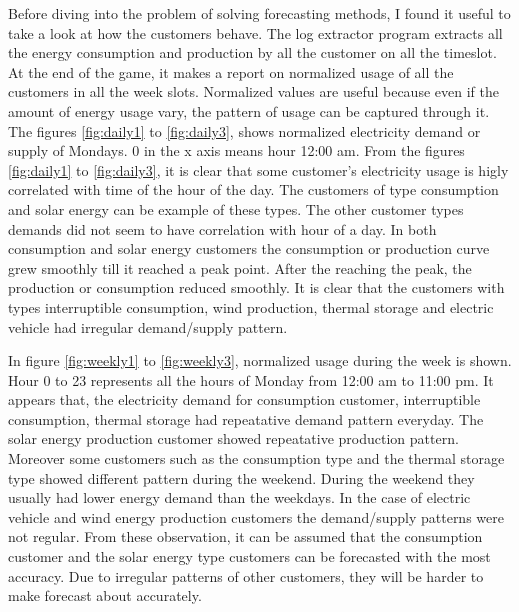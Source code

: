 Before diving into the problem of solving forecasting methods, I found it useful to take a look at how the customers behave. The log extractor program extracts all the energy consumption and production by all the customer on all the timeslot. At the end of the game, it makes a report on normalized usage of all the customers in all the week slots. Normalized values are useful because even if the amount of energy usage vary, the pattern of usage can be captured through it. The figures \ref{fig:daily1} to \ref{fig:daily3}, shows normalized electricity demand or supply of Mondays. 0 in the x axis means hour 12:00 am. From the figures \ref{fig:daily1} to \ref{fig:daily3}, it is clear that some customer's electricity usage is higly correlated with time of the hour of the day. The customers of type consumption and solar energy can be example of these types. The other customer types demands did not seem to have correlation with hour of a day. In both consumption and solar energy customers the consumption or production curve grew smoothly till it reached a peak point. After the reaching the peak, the production or consumption reduced smoothly. It is clear that the customers with types interruptible consumption, wind production, thermal storage and electric vehicle had irregular demand/supply pattern. 

In figure \ref{fig:weekly1} to \ref{fig:weekly3}, normalized usage during the week is shown. Hour 0 to 23 represents all the hours of Monday from 12:00 am to 11:00 pm. It appears that, the electricity demand for consumption customer, interruptible consumption, thermal storage had repeatative demand pattern everyday. The  solar energy production customer showed repeatative production pattern. Moreover some customers such as the consumption type and the thermal storage type showed different pattern during the weekend. During the weekend they usually had lower energy demand than the weekdays. In the case of electric vehicle and wind energy production customers the demand/supply patterns were not regular. From these observation, it can be assumed that the consumption customer and the solar energy type customers can be forecasted with the most accuracy. Due to irregular patterns of other customers, they will be harder to make forecast about accurately.
 
